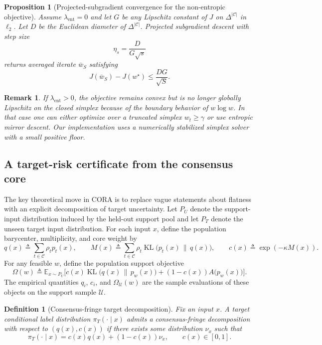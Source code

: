 \documentclass{article}
\newtheorem{proposition}{Proposition}
\newtheorem{definition}{Definition}
\newtheorem{remark}{Remark}
\newcommand{\EE}{\mathbb{E}}
\newcommand{\cC}{\mathcal{C}}
\newcommand{\cU}{\mathcal{U}}
\newcommand{\KL}{\operatorname{KL}}
\newcommand{\cora}{\textup{\textsc{CORA}}}
\newcommand{\simplex}{\Delta}
\begin{document}
\begin{proposition}[Projected-subgradient convergence for the non-entropic objective]
\label{prop:subgrad}
Assume $\lambda_{\mathrm{ent}} = 0$ and let $G$ be any Lipschitz constant of $J$ on $\simplex^{|\cC|}$ in $\ell_2$. Let $D$ be the Euclidean diameter of $\simplex^{|\cC|}$. Projected subgradient descent with step size
\[
    \eta_s = \frac{D}{G\sqrt{s}}
\]
returns averaged iterate $\bar w_S$ satisfying
\begin{equation}
    J(\bar w_S) - J(w^\star)
    \le
    \frac{DG}{\sqrt{S}}.
    \label{eq:subgrad_rate}
\end{equation}
\end{proposition}

\begin{remark}
If $\lambda_{\mathrm{ent}}>0$, the objective remains convex but is no longer globally Lipschitz on the closed simplex because of the boundary behavior of $w\log w$. In that case one can either optimize over a truncated simplex $w_t\ge \gamma$ or use entropic mirror descent. Our implementation uses a numerically stabilized simplex solver with a small positive floor.
\end{remark}

\subsection{A target-risk certificate from the consensus core}

The key theoretical move in \cora{} is to replace vague statements about flatness with an explicit decomposition of target uncertainty. Let $P_U$ denote the support-input distribution induced by the held-out support pool and let $P_T$ denote the unseen target input distribution. For each input $x$, define the population barycenter, multiplicity, and core weight by
\[
    q(x) \triangleq \sum_{t\in\cC}\rho_t p_t(x),
    \qquad
    M(x) \triangleq \sum_{t\in\cC}\rho_t \KL\!\big(p_t(x)\,\|\,q(x)\big),
    \qquad
    c(x) \triangleq \exp(-\kappa M(x)).
\]
For any feasible $w$, define the population support objective
\[
    \Omega(w)
    \triangleq
    \EE_{x\sim P_U}
    \Big[
        c(x)\KL\!\big(q(x)\,\|\,p_w(x)\big)
        +
        (1-c(x))A\!\big(p_w(x)\big)
    \Big].
\]
The empirical quantities $q_i$, $c_i$, and $\Omega_{\cU}(w)$ are the sample evaluations of these objects on the support sample $\cU$.

\begin{definition}[Consensus-fringe target decomposition]
\label{def:decomp}
Fix an input $x$. A target conditional label distribution $\pi_T(\cdot\mid x)$ admits a consensus-fringe decomposition with respect to $(q(x),c(x))$ if there exists some distribution $\nu_x$ such that
\begin{equation}
    \pi_T(\cdot\mid x)
    =
    c(x) q(x) + (1-c(x)) \nu_x,
    \qquad
    c(x)\in[0,1].
    \label{eq:decomp}
\end{equation}
\end{definition}
\end{document}
